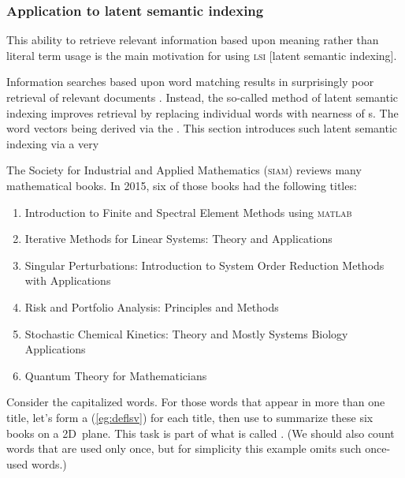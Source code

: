 





\subsubsection{Application to latent semantic indexing}
\label{sec:alsi}

\begin{quoted}{\cite{Berry95}}%
This ability to retrieve relevant information based upon meaning rather than literal term usage is the main motivation for using \textsc{lsi} [latent semantic indexing].
\end{quoted}

Information searches based upon word matching results in surprisingly poor retrieval of relevant documents \cite[\S5.5]{Berry95}.
Instead, the so-called method of latent semantic indexing improves 
retrieval by replacing individual words with nearness of s. 
The word vectors being derived via the .
This section introduces such latent semantic indexing via a very 


The Society for Industrial and Applied Mathematics (\textsc{siam}) reviews many mathematical books.
In 2015, six of those books had the following titles:
\begin{enumerate}
\item Introduction to Finite and Spectral Element Methods using \textsc{matlab}
\item Iterative Methods for Linear Systems: Theory and Applications 
\item Singular Perturbations: Introduction to System Order Reduction Methods with Applications 
\item Risk and Portfolio Analysis: Principles and Methods 
\item Stochastic Chemical Kinetics: Theory and Mostly Systems Biology Applications
\item Quantum Theory for Mathematicians 
\end{enumerate}
Consider the capitalized words. 
For those words that appear in more than one title, let's form a  (\cref{eg:deflsv}) for each title, then use  to summarize these six books on a 2D~plane.
This task is part of what is called  \cite[]{Berry95}.  
(We should also count words that are used only once, but for simplicity this example omits such once-used words.)

